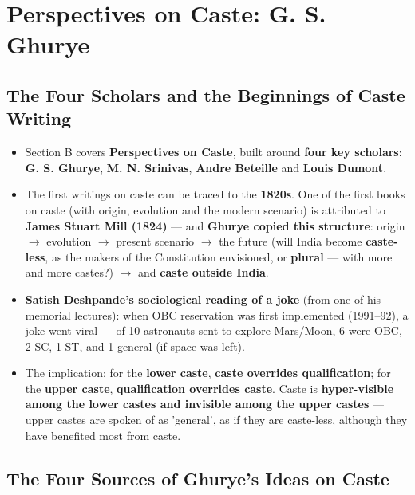 \chapter{Perspectives on Caste: G. S. Ghurye}

\section{The Four Scholars and the Beginnings of Caste Writing}

\begin{KeyConcept}
\begin{itemize}
\item Section B covers \textbf{Perspectives on Caste}, built around \textbf{four key scholars}: \textbf{G. S. Ghurye}, \textbf{M. N. Srinivas}, \textbf{Andre Beteille} and \textbf{Louis Dumont}.
\item The first writings on caste can be traced to the \textbf{1820s}. One of the first books on caste (with origin, evolution and the modern scenario) is attributed to \textbf{James Stuart Mill (1824)} --- and \textbf{Ghurye copied this structure}: origin $\rightarrow$ evolution $\rightarrow$ present scenario $\rightarrow$ the future (will India become \textbf{caste-less}, as the makers of the Constitution envisioned, or \textbf{plural} --- with more and more castes?) $\rightarrow$ and \textbf{caste outside India}.
\end{itemize}
\end{KeyConcept}

\begin{ExampleBox}
\begin{itemize}
\item \textbf{Satish Deshpande's sociological reading of a joke} (from one of his memorial lectures): when OBC reservation was first implemented (1991--92), a joke went viral --- of 10 astronauts sent to explore Mars/Moon, 6 were OBC, 2 SC, 1 ST, and 1 general (if space was left).
\item The implication: for the \textbf{lower caste}, \textbf{caste overrides qualification}; for the \textbf{upper caste}, \textbf{qualification overrides caste}. Caste is \textbf{hyper-visible among the lower castes and invisible among the upper castes} --- upper castes are spoken of as 'general', as if they are caste-less, although they have benefited most from caste.
\end{itemize}
\end{ExampleBox}

\section{The Four Sources of Ghurye's Ideas on Caste}

